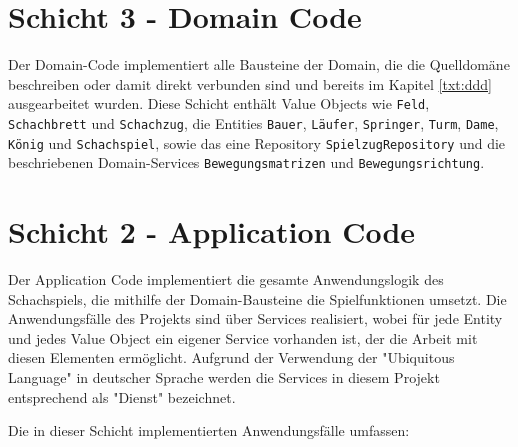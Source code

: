 \section{Schicht 3 - Domain Code}

Der Domain-Code implementiert alle Bausteine der Domain, die die Quelldomäne beschreiben oder damit direkt verbunden sind und bereits im Kapitel \ref{txt:ddd} ausgearbeitet wurden. 
Diese Schicht enthält Value Objects wie \texttt{Feld}, \texttt{Schachbrett} und \texttt{Schachzug}, die Entities \texttt{Bauer}, \texttt{Läufer}, \texttt{Springer}, \texttt{Turm}, \texttt{Dame}, \texttt{König} und \texttt{Schachspiel}, sowie das eine Repository \texttt{SpielzugRepository} und die beschriebenen Domain-Services \texttt{Bewegungsmatrizen} und \texttt{Bewegungsrichtung}.

\section{Schicht 2 - Application Code}

Der Application Code implementiert die gesamte Anwendungslogik des Schachspiels, die mithilfe der Domain-Bausteine die Spielfunktionen umsetzt. 
Die Anwendungsfälle des Projekts sind über Services realisiert, wobei für jede Entity und jedes Value Object ein eigener Service vorhanden ist, der die Arbeit mit diesen Elementen ermöglicht. 
Aufgrund der Verwendung der "Ubiquitous Language" in deutscher Sprache werden die Services in diesem Projekt entsprechend als "Dienst" bezeichnet.

Die in dieser Schicht implementierten Anwendungsfälle umfassen:

